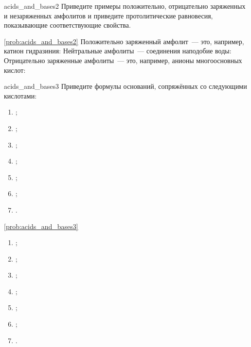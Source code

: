 \begin{problem}{}{acids_and_bases2}
    Приведите примеры положительно, отрицательно заряженных и незаряженных амфолитов и приведите протолитические равновесия, показывающие соответствующие свойства.
    \begin{sol}{\ref{prob:acids_and_bases2}}
        Положительно заряженный амфолит~--- это, например, катион гидразиния:
        Нейтральные амфолиты~--- соединения наподобие воды:
        Отрицательно заряженные амфолиты~--- это, например, анионы многоосновных кислот:
    \end{sol}
\end{problem}

\begin{problem}{}{acids_and_bases3}
    Приведите формулы оснований, сопряжённых со следующими кислотами:
    \begin{enumerate}[label=\arabic*)]
        \item {};
        \item {};
        \item {};
        \item {};
        \item {};
        \item {};
        \item {}.
    \end{enumerate}
    \begin{sol}{\ref{prob:acids_and_bases3}}
        \begin{enumerate}[label=\arabic*)]
            \item {};
            \item {};
            \item {};
            \item {};
            \item {};
            \item {};
            \item {}.
        \end{enumerate}
    \end{sol}
\end{problem}

